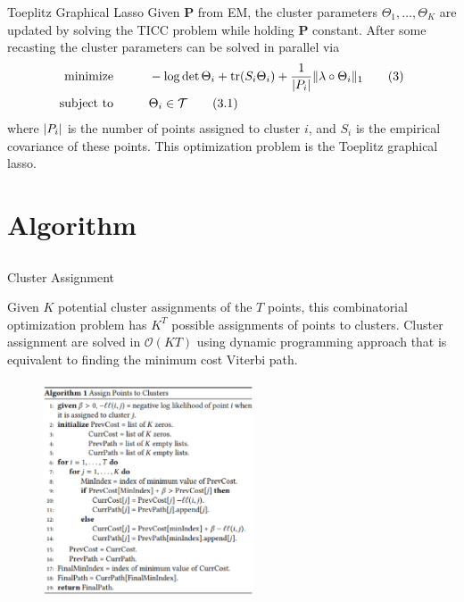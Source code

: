 \documentclass{beamer}
\DeclarePairedDelimiter \norm{\lVert}{\rVert}%
\DeclarePairedDelimiter \abs{\lvert}{\rvert}%
\begin{document}
\begin{frame}{Toeplitz Graphical Lasso}
	Given $\boldsymbol{P}$ from EM, the cluster parameters $\Theta_1, \dots, \Theta_K$ are updated by solving the TICC problem while holding $\boldsymbol{P}$ constant. After some recasting the cluster parameters can be solved in parallel via
	\begin{align*}
		\text{minimize} \hspace{1cm} & -\log\det\Theta_i + \text{tr}(S_i\Theta_i) + \frac{1}{\abs{P_i}}\norm{\lambda \circ \Theta_i}_1 \tag{3} \\
		\text{subject to} \hspace{1cm} & \Theta_i \in \mathcal{T} \tag{3.1}
	\end{align*}
	where $\abs{P_i}$ is the number of points assigned to cluster $i$, and $S_i$ is the empirical covariance of these points. This optimization problem is the Toeplitz graphical lasso. 
\end{frame}


\section{Algorithm}
\subsection{}

\begin{frame}{Cluster Assignment}
	\begin{minipage}{.4\textwidth}
	Given $K$ potential cluster assignments of the $T$ points, this combinatorial
	optimization problem has $K^T$ possible assignments of points to clusters. Cluster assignment are solved in $\mathcal{O}(KT)$ using  dynamic programming approach that is equivalent to finding the minimum cost Viterbi path. 
	\end{minipage}%
	\hspace{.1cm}
	\begin{minipage}{.575\textwidth}
		\begin{figure}
			\includegraphics[height=6.5cm, width=6.25cm]{fig6.eps}
		\end{figure}
	\end{minipage}
\end{frame}
\end{document}
